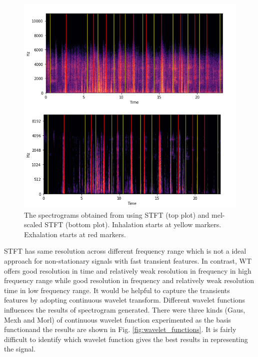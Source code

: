 \begin{figure}[h]
    \centerline{\includegraphics[scale=0.55]{figures/stft_mel-stft.png}}
    \caption{The spectrograms obtained from using STFT (top plot) and mel-scaled STFT (bottom plot). Inhalation starts at yellow markers. Exhalation starts at red markers.}
    \label{fig:stft_mel-stft}
\end{figure}

STFT has same resolution across different frequency range which is not a ideal approach for non-stationary signals with fast transient features. In contrast, WT offers good resolution in time and relatively weak resolution in frequency in high frequency range while good resolution in frequency and relatively weak resolution time in low frequency range. It would be helpful to capture the transients features by adopting continuous wavelet transform. Different wavelet functions influences the results of spectrogram generated. There were three kinds (Gaus, Mexh and Morl) of continuous wavelet function experimented as the basis functionand the results are shown in Fig. \ref{fig:wavelet_functions}. It is fairly difficult to identify which wavelet function gives the best results in representing the signal.

